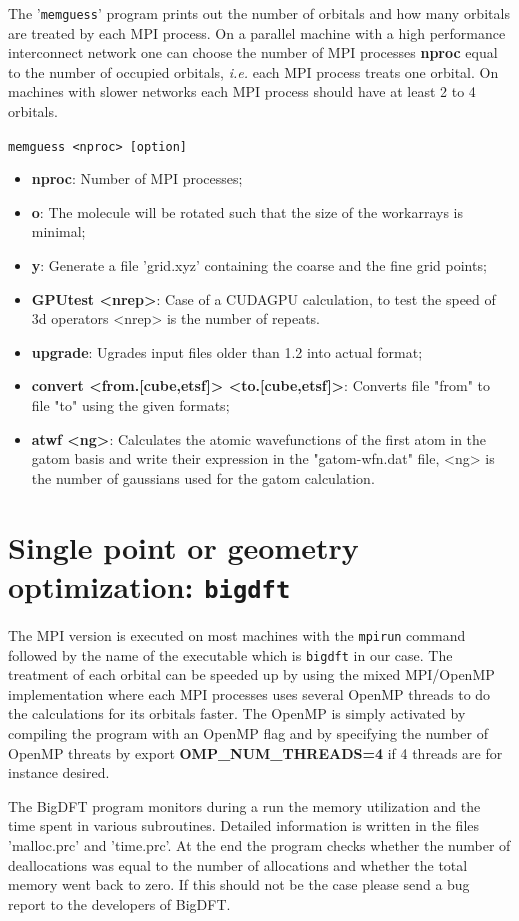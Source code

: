 \documentclass[a4paper,11pt]{report}
\begin{document}
The '\texttt{memguess}' program prints out the number of orbitals and how many orbitals are treated by each MPI process. 
On a parallel machine with a high performance interconnect network one can choose the number of MPI processes {\bf nproc} equal 
to the number of occupied orbitals, \textit{i.e.} each MPI process treats one orbital. On machines with slower networks each MPI process should 
have at least 2 to 4 orbitals.

\texttt{memguess <nproc> [option]}

\begin{itemize}
\item {\bf nproc}: Number of MPI processes;
\item {\bf o}: The molecule will be rotated such that the size of the workarrays is minimal;
\item {\bf y}: Generate a file 'grid.xyz' containing the coarse and the fine grid points;
\item {\bf GPUtest <nrep>}: Case of a CUDAGPU calculation, to test the speed of 3d operators <nrep> is the number of repeats.
\item {\bf upgrade}: Ugrades input files older than 1.2 into actual format;
\item {\bf convert <from.[cube,etsf]> <to.[cube,etsf]>}: Converts file "from" to file "to" using the given formats;
\item {\bf atwf <ng>}: Calculates the atomic wavefunctions of the first atom in the gatom basis and write their expression in the "gatom-wfn.dat" file, <ng> is the number of gaussians used for the gatom calculation.
\end{itemize}

\section{Single point or geometry optimization: \texttt{bigdft}}
The MPI version is executed on most machines with the \texttt{mpirun} command followed by the name of the executable which is 
\texttt{bigdft} in our case.
The treatment of each orbital can be speeded up by using the mixed MPI/OpenMP implementation 
where each MPI processes uses several OpenMP threads to do the calculations for its orbitals faster. 
The OpenMP is simply activated by compiling the program with an OpenMP flag and by specifying the number of OpenMP threats by
export \textbf{OMP\_NUM\_THREADS=4} if 4 threads are for instance desired.

\noindent
The BigDFT program monitors during a run the memory utilization and the time spent in various subroutines. Detailed information 
is written in the files 'malloc.prc' and 'time.prc'. At the end the program checks whether the number of deallocations was equal 
to the number of allocations and whether the total memory went back to zero. If this should not be the case please send a bug report to the developers of BigDFT.
\end{document}
